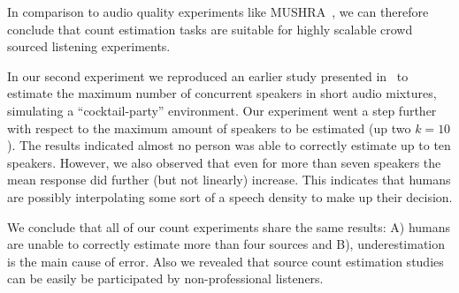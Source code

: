 In comparison to audio quality experiments like MUSHRA~\cite{recommendation2001MUSHRA}, we can therefore conclude that count estimation tasks are suitable for highly scalable crowd sourced listening experiments.
\par
In our second experiment we reproduced an earlier study presented in~\cite{kawashima15} to estimate the maximum number of concurrent speakers in short audio mixtures, simulating a ``cocktail-party'' environment.
Our experiment went a step further with respect to the maximum amount of speakers to be estimated (up two \(k=10\)).
The results indicated almost no person was able to correctly estimate up to ten speakers.
However, we also observed that even for more than seven speakers the mean response did further (but not linearly) increase.
This indicates that humans are possibly interpolating some sort of a speech density to make up their decision.
\par
We conclude that all of our count experiments share the same results: A) humans are unable to correctly estimate more than four sources and B), underestimation is the main cause of error.
Also we revealed that source count estimation studies can be easily be participated by non-professional listeners.